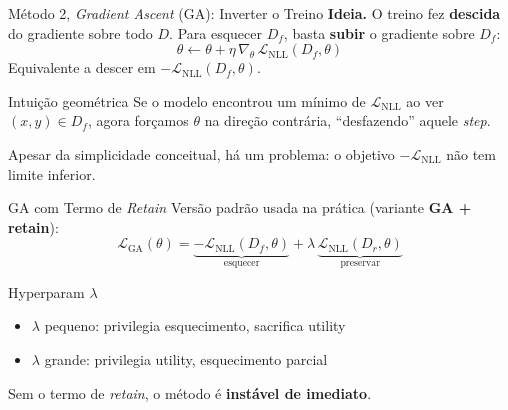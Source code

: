 \documentclass[aspectratio=169,xcolor=dvipsnames]{beamer}
\begin{document}
  \begin{frame}{Método 2, \textit{Gradient Ascent} (GA): Inverter o Treino}
    \textbf{Ideia.} O treino fez \textbf{descida} do gradiente sobre todo $D$. Para esquecer $D_f$, basta \textbf{subir} o gradiente sobre $D_f$:
    \[
      \theta \leftarrow \theta + \eta\, \nabla_\theta\, \mathcal{L}_{\text{NLL}}(D_f, \theta)
    \]
    Equivalente a descer em $-\mathcal{L}_{\text{NLL}}(D_f, \theta)$.

    \vspace{0.4em}
    \begin{block}{Intuição geométrica}
      Se o modelo encontrou um mínimo de $\mathcal{L}_{\text{NLL}}$ ao ver $(x, y) \in D_f$, agora forçamos $\theta$ na direção contrária, ``desfazendo'' aquele \textit{step}.
    \end{block}

    \vspace{0.4em}
    \footnotesize Apesar da simplicidade conceitual, há um problema: o objetivo $-\mathcal{L}_{\text{NLL}}$ não tem limite inferior.
  \end{frame}

  \begin{frame}{GA com Termo de \textit{Retain}}
    Versão padrão usada na prática (variante \textbf{GA + retain}):
    \[
      \mathcal{L}_{\text{GA}}(\theta) = \underbrace{-\mathcal{L}_{\text{NLL}}(D_f, \theta)}_{\text{esquecer}}
                                       + \lambda\, \underbrace{\mathcal{L}_{\text{NLL}}(D_r, \theta)}_{\text{preservar}}
    \]

    \vspace{0.3em}
    \begin{block}{Hyperparam $\lambda$}
      \begin{itemize}\setlength{\itemsep}{0pt}
        \item $\lambda$ pequeno: privilegia esquecimento, sacrifica utility
        \item $\lambda$ grande: privilegia utility, esquecimento parcial
      \end{itemize}
    \end{block}

    \vspace{0.3em}
    Sem o termo de \textit{retain}, o método é \textbf{instável de imediato}.
  \end{frame}
\end{document}
